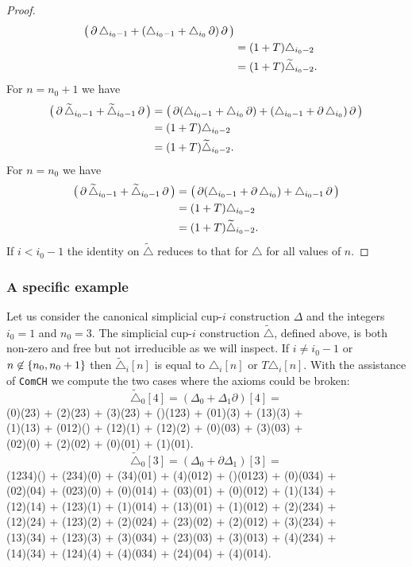 \begin{proof}
\begin{align*}
		\big(\operatorname{\partial}\triangle_{i_0-1} + (\triangle_{i_0-1} + \triangle_{i_0} \operatorname{\partial})\operatorname{\partial}\big) \\ &=
		(1+T)\triangle_{i_0-2} \\ &=
		(1+T)\widetilde\triangle_{i_0-2}.
	\end{align*}
	For $n = n_0+1$ we have
	\begin{align*}
		\big(\operatorname{\partial}\widetilde\triangle_{i_0-1} + \widetilde\triangle_{i_0-1} \operatorname{\partial}\big) &=
		\big(\operatorname{\partial}(\triangle_{i_0-1} + \triangle_{i_0} \operatorname{\partial}) + (\triangle_{i_0-1} + \operatorname{\partial}\triangle_{i_0})\operatorname{\partial} \big) \\ &=
		(1+T)\triangle_{i_0-2} \\ &=
		(1+T)\widetilde\triangle_{i_0-2}.
	\end{align*}
	For $n = n_0$ we have
	\begin{align*}
		\big(\operatorname{\partial}\widetilde\triangle_{i_0-1} + \widetilde\triangle_{i_0-1} \operatorname{\partial}\big) &=
		\big(\operatorname{\partial}(\triangle_{i_0-1} + \operatorname{\partial}\triangle_{i_0}) + \triangle_{i_0-1}\operatorname{\partial} \big) \\ &=
		(1+T)\triangle_{i_0-2} \\ &=
		(1+T)\widetilde\triangle_{i_0-2}.
	\end{align*}
	If $i<i_0-1$ the identity on $\widetilde\triangle$ reduces to that for $\triangle$ for all values of $n$.
\end{proof}

\subsubsection{A specific example}

Let us consider the canonical simplicial \mbox{cup-$i$} construction $\Delta$ and the integers $i_0=1$ and $n_0=3$.
The simplicial \mbox{cup-$i$} construction $\widetilde\triangle$, defined above, is both non-zero and free but not irreducible as we will inspect.
If $i \neq i_0-1$ or $n \not\in \{n_0,n_0+1\}$ then $\widetilde\triangle_i[n]$ is equal to $\triangle_i[n]$ or $T\triangle_i[n]$.
With the assistance of \texttt{ComCH} we compute the two cases where the axioms could be broken:
\[
\widetilde\triangle_0[4] = (\Delta_0 + \Delta_1\partial)[4] =
\]
\noindent
{\ttfamily
	(0)(23) + (2)(23) + (3)(23) + ()(123) + (01)(3) + (13)(3) +\\
	(1)(13) + (012)() + (12)(1) + (12)(2) + (0)(03) + (3)(03) +\\
	(02)(0) + (2)(02) + (0)(01) + (1)(01).}
\[
\widetilde\triangle_0[3] = (\Delta_0 + \partial\Delta_1)[3] =
\]
\noindent
{\ttfamily
	(1234)() + (234)(0) + (34)(01) + (4)(012) + ()(0123) + (0)(034) +\\
	(02)(04) + (023)(0) + (0)(014) + (03)(01) + (0)(012) + (1)(134) +\\
	(12)(14) + (123)(1) + (1)(014) + (13)(01) + (1)(012) + (2)(234) +\\
	(12)(24) + (123)(2) + (2)(024) + (23)(02) + (2)(012) + (3)(234) +\\
	(13)(34) + (123)(3) + (3)(034) + (23)(03) + (3)(013) + (4)(234) +\\
	(14)(34) + (124)(4) + (4)(034) + (24)(04) + (4)(014).}

